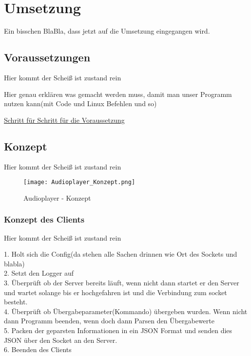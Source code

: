 
\chapter{Umsetzung}

Ein bisschen BlaBla, dass jetzt auf die Umsetzung eingegangen wird.


\section{Voraussetzungen}
Hier kommt der Scheiß ist zustand rein

Hier genau erklären was gemacht werden muss, damit man unser Programm nutzen kann(mit Code und Linux Befehlen und so)

\href{https://github.com/alexanderklapdor/RaspberryPi_Go_Audioplayer#installation}{Schritt für Schritt für die Voraussetzung}

\section{Konzept}
Hier kommt der Scheiß ist zustand rein
\begin{figure}[h]
	\centering
	\texttt{[image: Audioplayer\_Konzept.png]}
	\caption{Audioplayer - Konzept}
	\label{img:grafik-RaspberryPi3}
\end{figure}
\newline

\subsection{Konzept des Clients}
Hier kommt der Scheiß ist zustand rein

1. Holt sich die Config(da stehen alle Sachen drinnen wie Ort des Sockets und blabla)\\
2. Setzt den Logger auf \\
3. Überprüft ob der Server bereits läuft, wenn nicht dann startet er den Server und wartet solange bis er hochgefahren ist und die Verbindung zum socket besteht. \\
4. Überprüft ob Übergabeparameter(Kommando) übergeben wurden. Wenn nicht dann Programm beenden, wenn doch dann Parsen den Übergabewerte \\
5. Packen der geparsten Informationen in ein JSON Format und senden dies JSON über den Socket an den Server. \\
6. Beenden des Clients \\

